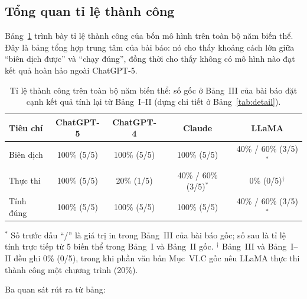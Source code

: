 \label{sec:ketqua}

\subsection{Tổng quan tỉ lệ thành công}

Bảng~\ref{tab:success} trình bày tỉ lệ thành công của bốn mô hình trên toàn bộ
năm biến thể. Đây là bảng tổng hợp trung tâm của bài báo: nó cho thấy khoảng cách
lớn giữa “biên dịch được” và “chạy đúng”, đồng thời cho thấy không có mô hình nào
đạt kết quả hoàn hảo ngoài ChatGPT-5.

\begin{table}[H]
\centering
\small
\caption{Tỉ lệ thành công trên toàn bộ năm biến thể: số gốc ở Bảng~III của bài báo
\cite{diehl2026} đặt cạnh kết quả tính lại từ Bảng~I--II (dựng chi tiết ở
Bảng~\ref{tab:detail}).}
\label{tab:success}
\begin{tabular}{@{}lcccc@{}}
\toprule
\textbf{Tiêu chí} & \textbf{ChatGPT-5} & \textbf{ChatGPT-4} & \textbf{Claude} & \textbf{LLaMA} \\
\midrule
Biên dịch & 100\% (5/5) & 100\% (5/5) & 100\% (5/5) & 40\% / 60\% (3/5)$^*$ \\
Thực thi  & 100\% (5/5) & 20\% (1/5)  & 40\% / 60\% (3/5)$^*$ & 0\% (0/5)$^\dagger$ \\
Tính đúng & 100\% (5/5) & 100\% (5/5) & 100\% (5/5) & 40\% / 60\% (3/5)$^*$ \\
\bottomrule
\end{tabular}
\par\vspace{4pt}
{\footnotesize\raggedright
$^*$ Số trước dấu ``/'' là giá trị in trong Bảng~III của bài báo gốc; số sau là
tỉ lệ tính trực tiếp từ 5 biến thể trong Bảng~I và Bảng~II gốc.
$^\dagger$ Bảng~III và Bảng~I--II đều ghi 0\% (0/5), trong khi phần văn bản
Mục~VI.C gốc nêu LLaMA thực thi thành công một chương trình (20\%).\par}
\end{table}

Ba quan sát rút ra từ bảng:


